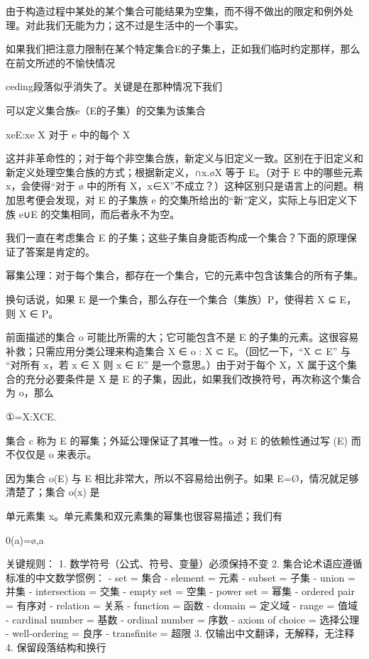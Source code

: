 \documentclass[12pt,a4paper]{ctexbook}
\theoremstyle{definition}
\theoremstyle{remark}
\begin{document}
由于构造过程中某处的某个集合可能结果为空集，而不得不做出的限定和例外处理。对此我们无能为力；这不过是生活中的一个事实。

如果我们把注意力限制在某个特定集合E的子集上，正如我们临时约定那样，那么在前文所述的不愉快情况

ceding段落似乎消失了。关键是在那种情况下我们

可以定义集合族e（E的子集）的交集为该集合

{xeE:xe X 对于 e 中的每个 X}

这并非革命性的；对于每个非空集合族，新定义与旧定义一致。区别在于旧定义和新定义处理空集合族的方式；根据新定义，∩x.øX 等于 E。（对于 E 中的哪些元素 x，会使得“对于 ø 中的所有 X，x∈X”不成立？）这种区别只是语言上的问题。稍加思考便会发现，对 E 的子集族 e 的交集所给出的“新”定义，实际上与旧定义下族 e∪{E} 的交集相同，而后者永不为空。

我们一直在考虑集合 E 的子集；这些子集自身能否构成一个集合？下面的原理保证了答案是肯定的。

幂集公理：对于每个集合，都存在一个集合，它的元素中包含该集合的所有子集。

换句话说，如果 E 是一个集合，那么存在一个集合（集族）P，使得若 X ⊆ E，则 X ∈ P。

前面描述的集合 o 可能比所需的大；它可能包含不是 E 的子集的元素。这很容易补救；只需应用分类公理来构造集合 {X ∈ o : X ⊂ E}。（回忆一下，“X ⊂ E” 与 “对所有 x，若 x ∈ X 则 x ∈ E” 是一个意思。）由于对于每个 X，X 属于这个集合的充分必要条件是 X 是 E 的子集，因此，如果我们改换符号，再次称这个集合为 o，那么

①={X:XCE}.

集合 c 称为 E 的幂集；外延公理保证了其唯一性。o 对 E 的依赖性通过写 (E) 而不仅仅是 o 来表示。

因为集合 o(E) 与 E 相比非常大，所以不容易给出例子。如果 E=Ø，情况就足够清楚了；集合 o(x) 是

单元素集 {x}。单元素集和双元素集的幂集也很容易描述；我们有

0({a})={ø,{a}}

关键规则： 1. 数学符号（公式、符号、变量）必须保持不变 2. 集合论术语应遵循标准的中文数学惯例： - set = 集合 - element = 元素 - subset = 子集 - union = 并集 - intersection = 交集 - empty set = 空集 - power set = 幂集 - ordered pair = 有序对 - relation = 关系 - function = 函数 - domain = 定义域 - range = 值域 - cardinal number = 基数 - ordinal number = 序数 - axiom of choice = 选择公理 - well-ordering = 良序 - transfinite = 超限 3. 仅输出中文翻译，无解释，无注释 4. 保留段落结构和换行
\end{document}
